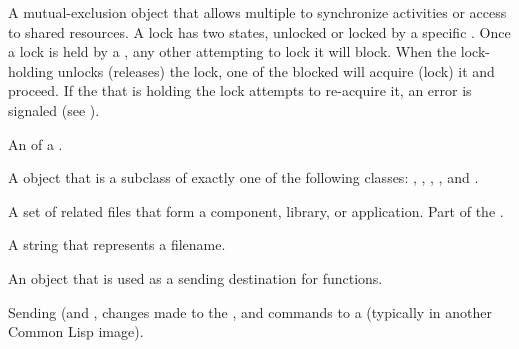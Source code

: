 \begin{glossary-list}
\glent[lock] 
%
%
%
%
A mutual-exclusion object that allows multiple  to
synchronize activities or access to shared resources. A lock has two
states, unlocked or locked by a specific . Once a lock
is held by a , any other  attempting to
lock it will block. When the lock-holding  unlocks
(releases) the lock, one of the blocked  will acquire
(lock) it and proceed.  If the  that is holding the lock
attempts to re-acquire it, an error is signaled (see
).


\glent[metaobject]
%
%
An  of a .


%
%
%
A  object that is a subclass of exactly one of the following
classes: , , ,
, and .


\glent[module]
%
%
%
A set of related files that form a component, library, or application.
Part of the .


\glent[namestring]
%
%
A string that represents a filename.


%
%
%
%
An object that is used as a sending destination for
 functions.


%
%
%
Sending  (and , changes made to the , and commands to a  (typically in another Common Lisp image).


\end{glossary-list}

